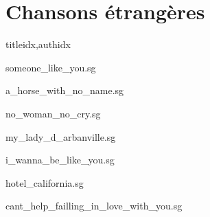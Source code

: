 \documentclass[12pt]{article}
\begin{document}
\part*{Chansons étrangères}

\begin{songs}{titleidx,authidx}

{someone_like_you.sg}


{a_horse_with_no_name.sg}


{no_woman_no_cry.sg}


{my_lady_d_arbanville.sg}


{i_wanna_be_like_you.sg}


{hotel_california.sg}


{cant_help_failling_in_love_with_you.sg}



\end{songs}
\end{document}
